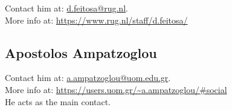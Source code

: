 \medskip
\noindent Contact him at: \href{mailto:d.feitosa@rug.nl}{d.feitosa@rug.nl}.\\
More info at: \url{https://www.rug.nl/staff/d.feitosa/}\\


\subsection{Apostolos Ampatzoglou}



\medskip
\noindent Contact him at: \href{mailto:a.ampatzoglou@uom.edu.gr}{a.ampatzoglou@uom.edu.gr}.\\
More info at: \url{https://users.uom.gr/~a.ampatzoglou/#social}\\
He acts as the main contact.
